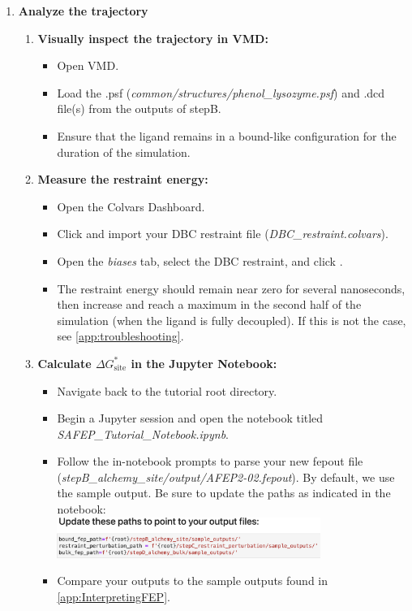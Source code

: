 \documentclass[9pt,tutorial]{Styling/livecoms}
\newcommand{\filepath}[1]{\textit{#1}}
\newcommand{\button}[1]{
  \inlineBox[gray]{\texttt{#1}}
}
\newcommand{\menu}[1]{
  \textit{#1}
}
\begin{document}
\begin{enumerate}
    \item \textbf{Analyze the trajectory}

    
    \begin{enumerate}[label=\alph*., ref=\theenumi.\alph*] \label{step:analyzeSite}
        \item \textbf{Visually inspect the trajectory in VMD:}
        \begin{itemize}
            \item Open VMD.
            \item Load the .psf (\filepath{common/structures/phenol\_lysozyme.psf}) and .dcd file(s) from the outputs of stepB.
            \item Ensure that the ligand remains in a bound-like configuration for the duration of the simulation.
        \end{itemize}
        \item \textbf{Measure the restraint energy:} 
        \begin{itemize}
            \item Open the Colvars Dashboard.
            \item Click \button{Load} and import your DBC restraint file (\filepath{DBC\_restraint.colvars}).
            \item Open the \menu{biases} tab, select the DBC restraint, and click \button{Energy Timeline}.
            \item The restraint energy should remain near zero for several nanoseconds, then increase and reach a maximum in the second half of the simulation (when the ligand is fully decoupled). If this is not the case, see \ref{app:troubleshooting}.
        \end{itemize}
        \item \textbf{Calculate $\Delta G^*_{\mathrm{site}}$ in the Jupyter Notebook:} \label{step:opennotebook}
        \begin{itemize}
            \item Navigate back to the tutorial root directory.
            \item Begin a Jupyter session and open the notebook titled \filepath{SAFEP\_Tutorial\_Notebook.ipynb}.
            \item Follow the in-notebook prompts to parse your new fepout file  (\filepath{stepB\_alchemy\_site/output/AFEP2-02.fepout}). By default, we use the sample output. Be sure to update the paths as indicated in the notebook:\\ \includegraphics[width=0.75\textwidth, trim={0 0 0 2cm},clip]{update_paths.png}
            \label{fig:updatePaths}
            \item Compare your outputs to the sample outputs found in \ref{app:InterpretingFEP}.
        \end{itemize}
    \end{enumerate}
\end{enumerate}
\end{document}

